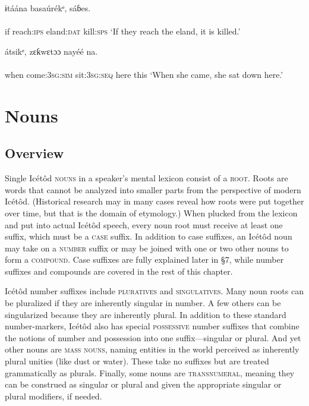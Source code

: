 \ea\label{ex:}
   ɨtáána   basaúrékᵉ,   sáɓes. \\
    \\
if   reach:\textsc{ips}   eland:\textsc{dat}   kill:\textsc{sps}
\glt ‘If they reach the eland, it is killed.’ 
\z




\ea\label{ex:}
   átsikᵉ,       zɛƙwɛtɔɔ   nayéé   na. \\
    \\
when   come:\textsc{3sg:sim}   sit:\textsc{3sg:seq}   here   this
\glt ‘When she came, she sat down here.’ 
\z




\section{Nouns}



\subsection{Overview}


Single Icétôd \textsc{nouns} in a speaker’s mental lexicon consist of a \textsc{root.} Roots are words that cannot be analyzed into smaller parts from the perspective of modern Icétôd. (Historical research may in many cases reveal how roots were put together over time, but that is the domain of etymology.) When plucked from the lexicon and put into actual Icétôd speech, every noun root must receive at least one suffix, which must be a \textsc{case} suffix. In addition to case suffixes, an Icétôd noun may take on a \textsc{number} suffix or may be joined with one or two other nouns to form a \textsc{compound}. Case suffixes are fully explained later in §7, while number suffixes and compounds are covered in the rest of this chapter.

Icétôd number suffixes include \textsc{pluratives} and \textsc{singulatives}. Many noun roots can be pluralized if they are inherently singular in number. A few others can be singularized because they are inherently plural. In addition to these standard number-markers, Icétôd also has special \textsc{possessive} number suffixes that combine the notions of number and possession into one suffix—singular or plural. And yet other nouns are \textsc{mass} \textsc{nouns}, naming entities in the world perceived as inherently plural unities (like dust or water). These take no suffixes but are treated grammatically as plurals. Finally, some nouns are \textsc{transnumeral}, meaning they can be construed as singular or plural and given the appropriate singular or plural modifiers, if needed. 

